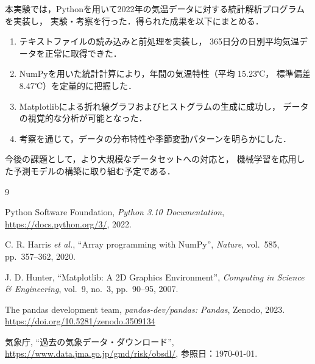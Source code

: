 \documentclass[12pt,a4paper]{ltjsarticle}
\begin{document}
本実験では，Pythonを用いて2022年の気温データに対する統計解析プログラムを実装し，
実験・考察を行った．得られた成果を以下にまとめる．

\begin{enumerate}[label=(\arabic*)] %
  \item テキストファイルの読み込みと前処理を実装し，
        365日分の日別平均気温データを正常に取得できた．
  \item NumPyを用いた統計計算により，年間の気温特性（平均 15.23℃，
        標準偏差 8.47℃）を定量的に把握した．
  \item Matplotlibによる折れ線グラフおよびヒストグラムの生成に成功し，
        データの視覚的な分析が可能となった．
  \item 考察を通じて，データの分布特性や季節変動パターンを明らかにした．
\end{enumerate}

今後の課題として，より大規模なデータセットへの対応と，
機械学習を応用した予測モデルの構築に取り組む予定である．

\begin{thebibliography}{9}

  Python Software Foundation,
  \textit{Python 3.10 Documentation},
  \url{https://docs.python.org/3/},
  2022.

  C. R. Harris \textit{et al.},
  ``Array programming with NumPy'',
  \textit{Nature}, vol.~585, pp.~357--362, 2020.

  J. D. Hunter,
  ``Matplotlib: A 2D Graphics Environment'',
  \textit{Computing in Science \& Engineering},
  vol.~9, no.~3, pp.~90--95, 2007.

  The pandas development team,
  \textit{pandas-dev/pandas: Pandas},
  Zenodo, 2023.
  \url{https://doi.org/10.5281/zenodo.3509134}

  気象庁,
  ``過去の気象データ・ダウンロード'',
  \url{https://www.data.jma.go.jp/gmd/risk/obsdl/},
  参照日：\today.

\end{thebibliography}
\end{document}

